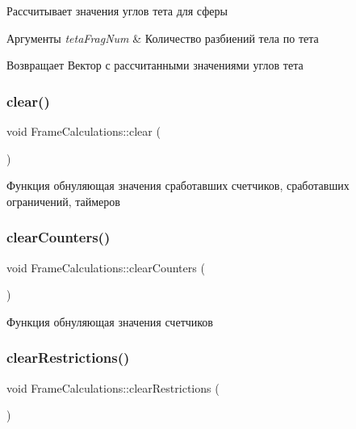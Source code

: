 Рассчитывает значения углов тета для сферы 
\begin{DoxyParams}{Аргументы}
{\em teta\+Frag\+Num} & Количество разбиений тела по тета \\
\hline
\end{DoxyParams}
\begin{DoxyReturn}{Возвращает}
Вектор с рассчитанными значениями углов тета 
\end{DoxyReturn}
\mbox{\label{class_frame_calculations_a5839ed07938c0985151452a1e0de98ed}} 
\subsubsection{\texorpdfstring{clear()}{clear()}}
{\footnotesize\ttfamily void Frame\+Calculations\+::clear (\begin{DoxyParamCaption}{ }\end{DoxyParamCaption})}

Функция обнуляющая значения сработавших счетчиков, сработавших ограничений, таймеров \mbox{\label{class_frame_calculations_a687365cd35332f572afbc8eeb9f51a86}} 
\subsubsection{\texorpdfstring{clear\+Counters()}{clearCounters()}}
{\footnotesize\ttfamily void Frame\+Calculations\+::clear\+Counters (\begin{DoxyParamCaption}{ }\end{DoxyParamCaption})}

Функция обнуляющая значения счетчиков \mbox{\label{class_frame_calculations_a6b220c05309876a8e74f756e4b650eba}} 
\subsubsection{\texorpdfstring{clear\+Restrictions()}{clearRestrictions()}}
{\footnotesize\ttfamily void Frame\+Calculations\+::clear\+Restrictions (\begin{DoxyParamCaption}{ }\end{DoxyParamCaption})}

